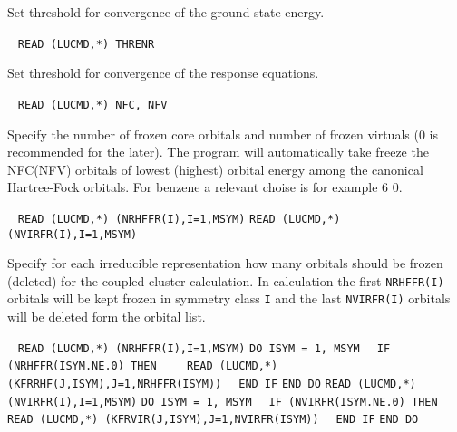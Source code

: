 \begin{description}
       Set threshold for convergence of the ground state energy.
 
\item[\Key{THRLEQ}] \verb| |\newline
       \verb|READ (LUCMD,*) THRENR|

       Set threshold for convergence of the response equations.
 
\item[\Key{FREEZE}] \verb| |\newline
      \verb|READ (LUCMD,*) NFC, NFV|

     Specify the number of frozen core orbitals and number of frozen virtuals (0 is recommended for the later).
     The program will automatically take freeze the NFC(NFV) orbitals of lowest (highest) orbital energy
     among the canonical Hartree-Fock orbitals.
     For benzene a relevant choise is for example 6 0.

\item[\Key{FROIMP}] \verb| |\newline
      \verb|READ (LUCMD,*) (NRHFFR(I),I=1,MSYM)|\newline
      \verb|READ (LUCMD,*) (NVIRFR(I),I=1,MSYM)|

      Specify for each irreducible representation how
      many orbitals should be frozen (deleted) for the coupled
      cluster calculation. In calculation the first \verb+NRHFFR(I)+
      orbitals will be kept frozen in symmetry class \verb+I+ and
      the last \verb+NVIRFR(I)+ orbitals will be deleted form the 
      orbital list.
 
\item[\Key{FROEXP}]  \verb| |\newline
    \verb|READ (LUCMD,*) (NRHFFR(I),I=1,MSYM)|\newline
    \verb|DO ISYM = 1, MSYM|\newline
    \verb|  IF (NRHFFR(ISYM.NE.0) THEN|\newline
    \verb|    READ (LUCMD,*) (KFRRHF(J,ISYM),J=1,NRHFFR(ISYM))|\newline
    \verb|  END IF|\newline
    \verb|END DO|\newline
    \verb|READ (LUCMD,*) (NVIRFR(I),I=1,MSYM)|\newline
    \verb|DO ISYM = 1, MSYM|\newline
    \verb|  IF (NVIRFR(ISYM.NE.0) THEN|\newline
    \verb|    READ (LUCMD,*) (KFRVIR(J,ISYM),J=1,NVIRFR(ISYM))|\newline
    \verb|  END IF|\newline
    \verb|END DO|


\end{description}
